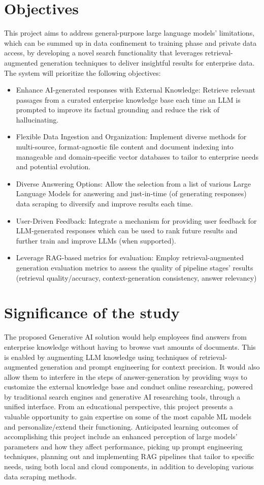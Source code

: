 \section{Objectives}
This project aims to address general-purpose large language models' limitations, which can be summed up in data confinement to training phase and private data access, by developing a novel search functionality that leverages retrieval-augmented generation techniques to deliver insightful results for enterprise data. The system will prioritize the following objectives:
\begin{itemize}
    \item Enhance AI-generated responses with External Knowledge: Retrieve relevant passages from a curated enterprise knowledge base each time an LLM is prompted to improve its factual grounding and reduce the risk of hallucinating.
    \item Flexible Data Ingestion and Organization: Implement diverse methods for multi-source, format-agnostic file content and document indexing into manageable and domain-specific vector databases to tailor to enterprise needs and potential evolution.
    \item Diverse Answering Options: Allow the selection from a list of various Large Language Models for answering and just-in-time (of generating responses) data scraping to diversify and improve results each time.
    \item User-Driven Feedback: Integrate a mechanism for providing user feedback for LLM-generated responses which can be used to rank future results and further train and improve LLMs (when supported).
    \item Leverage RAG-based metrics for evaluation: Employ retrieval-augmented generation evaluation metrics to assess the quality of pipeline stages' results (retrieval quality/accuracy, context-generation consistency, answer relevancy)
\end{itemize}
\newpage
\section{Significance of the study}
The proposed Generative AI solution would help employees find answers from enterprise knowledge without having to browse vast amounts of documents. This is enabled by augmenting LLM knowledge using techniques of retrieval-augmented generation and prompt engineering for context precision. It would also allow them to interfere in the steps of answer-generation by providing ways to customize the external knowledge base and conduct online researching, powered by traditional search engines and generative AI researching tools, through a unified interface.\medskip\newline
From an educational perspective, this project presents a valuable opportunity to gain expertise on some of the most capable ML models and personalize/extend their functioning. Anticipated learning outcomes of accomplishing this project include an enhanced perception of large models' parameters and how they affect performance, picking up prompt engineering techniques, planning out and implementing RAG pipelines that tailor to specific needs, using both local and cloud components, in addition to developing various data scraping methods.
